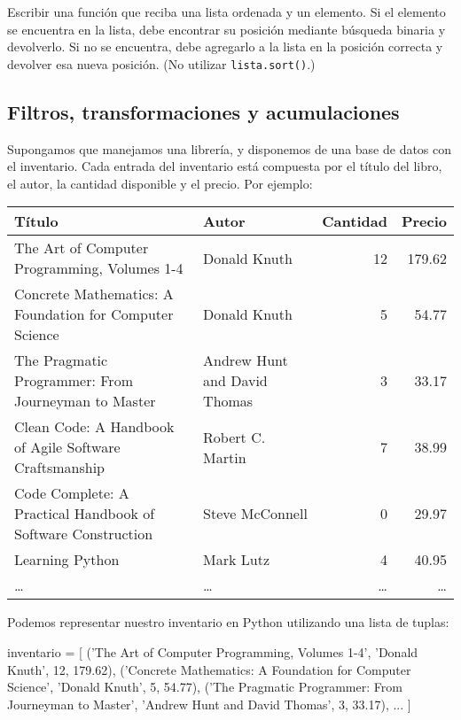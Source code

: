 \begin{ejercicio}
Escribir una función que reciba una lista ordenada y un elemento. Si el
elemento se encuentra en la lista, debe encontrar su posición mediante
búsqueda binaria y devolverlo.  Si no se encuentra, debe agregarlo a la
lista en la posición correcta y devolver esa nueva posición. (No utilizar
\verb!lista.sort()!.)
\end{ejercicio}


\newpage
\begin{subappendices}
\section{Filtros, transformaciones y acumulaciones}

Supongamos que manejamos una librería, y disponemos de una base de datos con el
inventario. Cada entrada del inventario está compuesta por el título del libro,
el autor, la cantidad disponible y el precio. Por ejemplo:

\begin{center}
\small
{}
\begin{tabular}{p{8cm} p{3cm} r r}
{\bf Título} & {\bf Autor} & {\bf Cantidad} & {\bf Precio} \\
\hline
The Art of Computer Programming, Volumes 1-4 & Donald Knuth & 12 & 179.62 \\
Concrete Mathematics: A Foundation for Computer Science & Donald Knuth & 5 & 54.77 \\
The Pragmatic Programmer: From Journeyman to Master & Andrew Hunt and David Thomas & 3 & 33.17 \\
Clean Code: A Handbook of Agile Software Craftsmanship & Robert C. Martin & 7 & 38.99 \\
Code Complete: A Practical Handbook of Software Construction & Steve McConnell & 0 & 29.97 \\
Learning Python & Mark Lutz & 4 & 40.95 \\
\ldots & \ldots & \ldots & \ldots \\ \hline
\end{tabular}
\end{center}

Podemos representar nuestro inventario en Python utilizando una lista de
tuplas:

\begin{codigo-python-sn}
inventario = [
    ('The Art of Computer Programming, Volumes 1-4',
     'Donald Knuth', 12, 179.62),
    ('Concrete Mathematics: A Foundation for Computer Science',
     'Donald Knuth', 5, 54.77),
    ('The Pragmatic Programmer: From Journeyman to Master',
     'Andrew Hunt and David Thomas', 3, 33.17),
    ...
]
\end{codigo-python-sn}


\end{subappendices}

